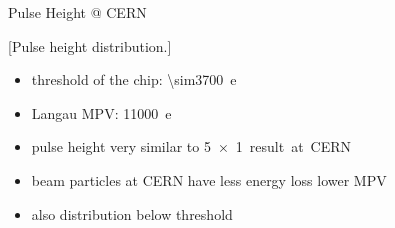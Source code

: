 \begin{frame}{Pulse Height @ CERN}

	\vspace*{-2ex}[Pulse height distribution.]\vspace*{-2ex}
	
	\begin{itemize}\itemfill
		\item threshold of the chip: \SI{\sim3700}{e}
		\item Langau MPV: \SI{11000}{e}
		\item pulse height very similar to \SI{5x1} result at CERN
		\item beam particles at CERN have less energy loss \ra lower MPV
		\item also distribution below threshold
	\end{itemize}
	
\end{frame}
